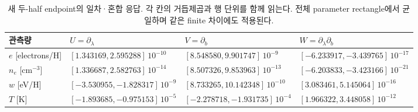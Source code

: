 \begin{table}[H]\centering\footnotesize
\caption{새 두-half endpoint의 일차·혼합 응답. 각 칸의 거듭제곱과 행 단위를 함께 읽는다. 전체 parameter rectangle에서 균일하며 같은 finite 차이에도 적용된다.}
\label{tab:response}
\setlength{\tabcolsep}{4pt}
\begin{tabular}{@{}llll@{}}\toprule
관측량 & $U=\partial_\lambda$ & $V=\partial_b$ & $W=\partial_\lambda\partial_b$\\\midrule
$e$ [electrons/H] & $[1.343169, 2.595288]\,10^{-10}$ & $[8.548580, 9.901747]\,10^{-9}$ & $[-6.233917, -3.439765]\,10^{-17}$\\
$n_e$ [cm$^{-3}$] & $[1.336687, 2.582763]\,10^{-14}$ & $[8.507326, 9.853963]\,10^{-13}$ & $[-6.203833, -3.423166]\,10^{-21}$\\
$w$ [eV/H] & $[-3.530955, -1.828317]\,10^{-9}$ & $[8.733265, 10.142348]\,10^{-10}$ & $[3.083461, 5.145064]\,10^{-16}$\\
$T$ [K] & $[-1.893685, -0.975153]\,10^{-5}$ & $[-2.278718, -1.931735]\,10^{-4}$ & $[1.966322, 3.448058]\,10^{-12}$\\
\bottomrule\end{tabular}
\end{table}
